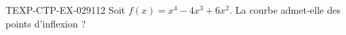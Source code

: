 \begin{exercice}{TEXP-CTP-EX-029}{1}{12}
Soit $f(x) = x^4 - 4x^3 + 6x^2$. La courbe admet-elle des points d'inflexion ?

\end{exercice}
